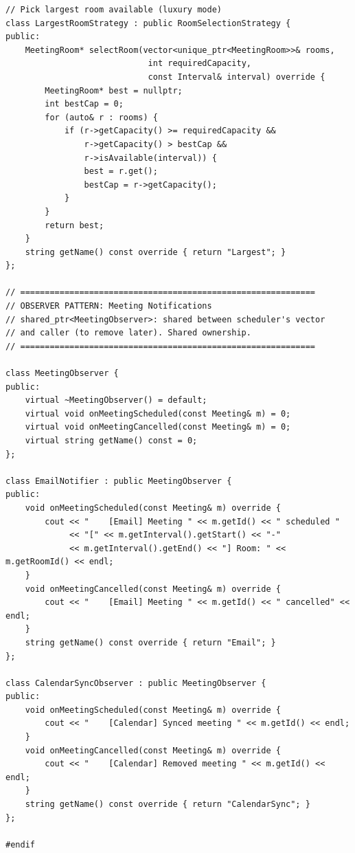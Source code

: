\documentclass[11pt,a4paper]{article}
\begin{document}
\begin{lstlisting}[title={\texttt{strategies.hpp}}]
// Pick largest room available (luxury mode)
class LargestRoomStrategy : public RoomSelectionStrategy {
public:
    MeetingRoom* selectRoom(vector<unique_ptr<MeetingRoom>>& rooms,
                             int requiredCapacity,
                             const Interval& interval) override {
        MeetingRoom* best = nullptr;
        int bestCap = 0;
        for (auto& r : rooms) {
            if (r->getCapacity() >= requiredCapacity &&
                r->getCapacity() > bestCap &&
                r->isAvailable(interval)) {
                best = r.get();
                bestCap = r->getCapacity();
            }
        }
        return best;
    }
    string getName() const override { return "Largest"; }
};

// ============================================================
// OBSERVER PATTERN: Meeting Notifications
// shared_ptr<MeetingObserver>: shared between scheduler's vector
// and caller (to remove later). Shared ownership.
// ============================================================

class MeetingObserver {
public:
    virtual ~MeetingObserver() = default;
    virtual void onMeetingScheduled(const Meeting& m) = 0;
    virtual void onMeetingCancelled(const Meeting& m) = 0;
    virtual string getName() const = 0;
};

class EmailNotifier : public MeetingObserver {
public:
    void onMeetingScheduled(const Meeting& m) override {
        cout << "    [Email] Meeting " << m.getId() << " scheduled "
             << "[" << m.getInterval().getStart() << "-"
             << m.getInterval().getEnd() << "] Room: " << m.getRoomId() << endl;
    }
    void onMeetingCancelled(const Meeting& m) override {
        cout << "    [Email] Meeting " << m.getId() << " cancelled" << endl;
    }
    string getName() const override { return "Email"; }
};

class CalendarSyncObserver : public MeetingObserver {
public:
    void onMeetingScheduled(const Meeting& m) override {
        cout << "    [Calendar] Synced meeting " << m.getId() << endl;
    }
    void onMeetingCancelled(const Meeting& m) override {
        cout << "    [Calendar] Removed meeting " << m.getId() << endl;
    }
    string getName() const override { return "CalendarSync"; }
};

#endif
\end{lstlisting}

\newpage
\end{document}
